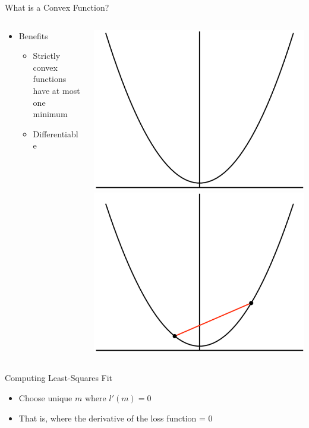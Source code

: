 \documentclass[aspectratio=169]{beamer}
\begin{document}
\begin{frame}{What is a Convex Function?}
\begin{columns}
\begin{column}{0.7\textwidth}
\begin{itemize}
\item Benefits
\begin{itemize}
\item Strictly convex functions have at most one minimum
\item Differentiable
\end{itemize}
\end{itemize}
\end{column}
\begin{column}{0.3\textwidth}
\includegraphics[width=.7\textwidth]{lectModel2/convex1.pdf}\\
\includegraphics[width=.7\textwidth]{lectModel2/convex2.pdf}
\end{column}
\end{columns}

\end{frame}
\begin{frame}{Computing Least-Squares Fit}

	\begin{itemize}
		\item Choose unique $m$ where $l'(m) = 0$
		\item That is, where the derivative of the loss function = 0
\end{itemize}
\end{frame}
\end{document}
